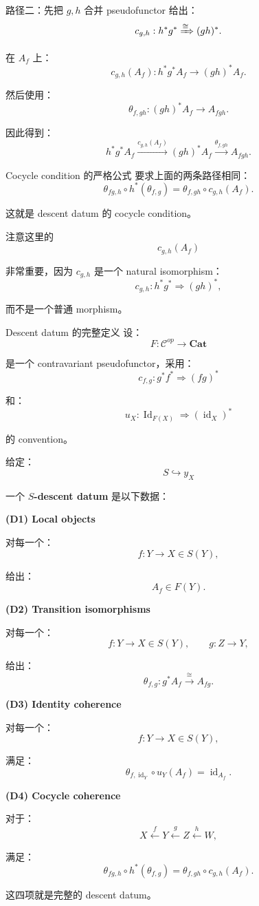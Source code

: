 \documentclass{beamer}
\begin{document}
\begin{frame}[fragile]{路径二：先把 \(g,h\) 合并}
pseudofunctor 给出：
$$
c_{g,h}:
h^*g^*
\xRightarrow{\cong}
(gh)^*.
$$

在 \(A_f\) 上：
$$
c_{g,h}(A_f):
h^*g^*A_f
\longrightarrow
(gh)^*A_f.
$$

然后使用：
$$
\theta_{f,gh}:
(gh)^*A_f
\longrightarrow
A_{fgh}.
$$

因此得到：
$$
\boxed{
h^*g^*A_f
\xrightarrow{c_{g,h}(A_f)}
(gh)^*A_f
\xrightarrow{\theta_{f,gh}}
A_{fgh}.
}
$$
\end{frame}

\begin{frame}[fragile]{Cocycle condition 的严格公式}
要求上面的两条路径相同：
$$
\boxed{
\theta_{fg,h}
\circ
h^*(\theta_{f,g})
=
\theta_{f,gh}
\circ
c_{g,h}(A_f).
}
$$

这就是 descent datum 的 cocycle condition。

注意这里的
$$
c_{g,h}(A_f)
$$

非常重要，因为 \(c_{g,h}\) 是一个 natural isomorphism：
$$
c_{g,h}:
h^*g^*
\Rightarrow
(gh)^*,
$$

而不是一个普通 morphism。
\end{frame}

\begin{frame}{Descent datum 的完整定义}
设：
$$
F:\mathcal C^{op}\to\mathbf{Cat}
$$

是一个 contravariant pseudofunctor，采用：
$$
c_{f,g}:g^*f^*\Rightarrow(fg)^*
$$

和：
$$
u_X:\operatorname{Id}_{F(X)}
\Rightarrow(\operatorname{id}_X)^*
$$

的 convention。

给定：
$$
S\hookrightarrow y_X
$$

一个 \textbf{\(S\)-descent datum} 是以下数据：

\textbf{(D1) Local objects}

对每一个：
$$
f:Y\to X\in S(Y),
$$

给出：
$$
\boxed{
A_f\in F(Y).
}
$$

\textbf{(D2) Transition isomorphisms}

对每一个：
$$
f:Y\to X\in S(Y),
\qquad
g:Z\to Y,
$$

给出：
$$
\boxed{
\theta_{f,g}:
g^*A_f
\xrightarrow{\cong}
A_{fg}.
}
$$

\textbf{(D3) Identity coherence}

对每一个：
$$
f:Y\to X\in S(Y),
$$

满足：
$$
\boxed{
\theta_{f,\operatorname{id}_Y}
\circ
u_Y(A_f)
=
\operatorname{id}_{A_f}.
}
$$

\textbf{(D4) Cocycle coherence}

对于：
$$
X\xleftarrow{f}Y\xleftarrow{g}Z\xleftarrow{h}W,
$$

满足：
$$
\boxed{
\theta_{fg,h}
\circ
h^*(\theta_{f,g})
=
\theta_{f,gh}
\circ
c_{g,h}(A_f).
}
$$

这四项就是完整的 descent datum。
\end{frame}
\end{document}
